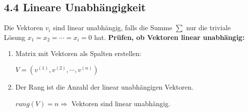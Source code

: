 \subsection{4.4 Lineare Unabhängigkeit}{
\vskip3pt

\begin{center}
\end{center}
\vspace{6pt}
Die Vektoren $v_i$ sind linear unabhängig, falls die Summe $\sum$ nur die triviale Lösung $x_1 = x_2 = \dotsm = x_i = 0$ hat.
\vskip8pt
\textbf{Prüfen, ob Vektoren linear unabhängig:}
\begin{enumerate}[label=\protect\circled{\arabic*}]
\item Matrix mit Vektoren als Spalten erstellen: \par $V = (v^{(1)}, v^{(2)}, \dotsm, v^{(n)})$
\item Der Rang ist die Anzahl der linear unabhängigen Vektoren. \par $rang(V) = n \Longrightarrow$ Vektoren sind linear unabhängig.
\end{enumerate}
\vspace{-4pt}

}
\WhiteSpace